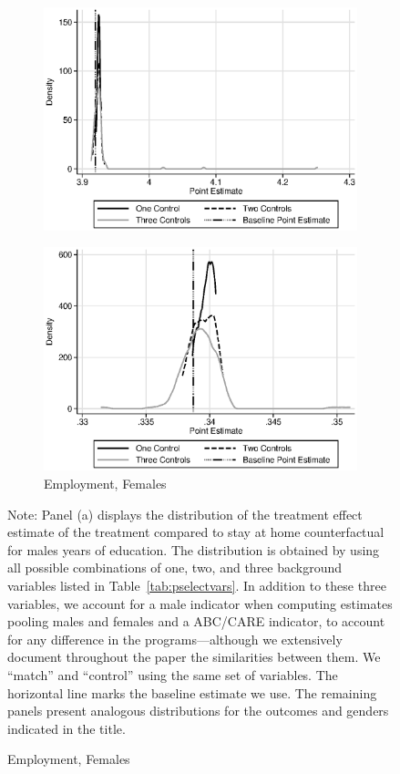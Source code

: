 \begin{figure}
\begin{subfigure}[h]{0.4\textwidth}
		\includegraphics[width=\textwidth]{output/sencontrols_female_years_30y_epan_ipw_P0.eps}
\end{subfigure}%
\begin{subfigure}[h]{0.4\textwidth}
	\centering
	\caption{Employment, Females}
		\includegraphics[width=\textwidth]{output/sencontrols_female_si30y_works_epan_ipw_P0.eps}
\end{subfigure}
\footnotesize \justify
Note: Panel (a) displays the distribution of the treatment effect estimate of the treatment compared to stay at home counterfactual for males years of education. The distribution is obtained by using all possible combinations of one, two, and three background variables listed in Table~\ref{tab:pselectvars}. In addition to these three variables, we account for a male indicator when computing estimates pooling males and females and a ABC/CARE indicator, to account for any difference in the programs---although we extensively document throughout the paper the similarities between them. We ``match'' and ``control'' using the same set of variables. The horizontal line marks the baseline estimate we use. The remaining panels present analogous distributions for the outcomes and genders indicated in the title.\\
\end{figure}

